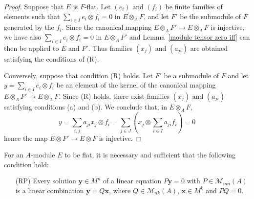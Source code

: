 \begin{proof}
Suppose that $E$ is $F$-flat. Let $(e_i)$ and $(f_i)$ be finite families of elements such that $\sum_{i\in I}e_i\otimes f_i=0$ in $E\otimes_AF$, and let $F'$ be the submodule of $F$ generated by the $f_i$. Since the canonical mapping $E\otimes_AF'\to E\otimes_AF$ is injective, we have also $\sum_{i\in I}e_i\otimes f_i=0$ in $E\otimes_AF'$ and Lemma~\ref{module tensor zero iff} can then be applied to $E$ and $F'$. Thus families $(x_j)$ and $(a_{ji})$ are obtained satisfying the conditions of (R).\par
Conversely, suppose that condition (R) holds. Let $F'$ be a submodule of $F$ and let $y=\sum_{i\in I}e_i\otimes f_i$ be an element of the kernel of the canonical mapping $E\otimes_AF'\to E\otimes_AF$. Since (R) holds, there exist families $(x_j)$ and $(a_{ji})$ satisfying conditions (a) and (b). We conclude that, in $E\otimes_AF$,
\[y=\sum_{i,j}a_{ji}x_j\otimes f_i=\sum_{j\in J}(x_j\otimes\sum_{i\in I}a_{ji}f_i)=0\]
hence the map $E\otimes F'\to E\otimes F$ is injective.
\end{proof}
\begin{corollary}
For an $A$-module $E$ to be flat, it is necessary and sufficient that the following condition hold:
\begin{enumerate}[leftmargin=30pt]
\item[(RP)] Every solution $\bm{y}\in M^n$ of a linear equation $P\bm{y}=0$ with $P\in\mathcal{M}_{mn}(A)$ is a linear combination $\bm{y}=Q\bm{x}$, where $Q\in\mathcal{M}_{nk}(A)$, $\bm{x}\in M^k$ and $PQ=0$.
\end{enumerate}
\end{corollary}
